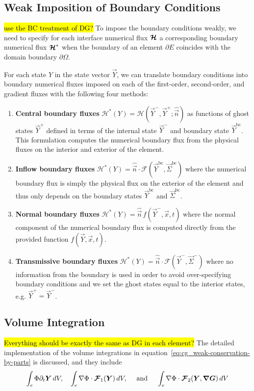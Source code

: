 \documentclass{report}
\numberwithin{equation}{section}
\begin{document}
\subsection{Weak Imposition of Boundary Conditions}
\hl{use the BC treatment of DG?}
To impose the boundary conditions weakly, we need to specify for each interface numerical flux $\boldsymbol{{\mathcal{H}}}$ a corresponding boundary numerical flux $\boldsymbol{{\mathcal{H}}}^*$ when the boundary of an element $\partial E$ coincides with the domain boundary $\partial \Omega$. 

For each state $Y$ in the state vector $\vec Y$, we can translate boundary conditions into boundary numerical fluxes imposed on each of the first-order, second-order, and gradient fluxes with the following four methods:
\begin{enumerate}
    \item \textbf{Central boundary fluxes} $\mathcal{H}^*(Y) = \mathcal{H}(\vec Y^-, \vec Y^+; \hat{\vec n })$ as functions of ghost states $\vec Y^+$ defined in terms of the internal state $\vec Y^-$ and boundary state $\vec Y^{\text{bc}}$. This formulation computes the numerical boundary flux from the physical fluxes on the interior and exterior of the element.
    \item \textbf{Inflow boundary fluxes} $\mathcal{H}^*(Y) = \hat{\vec n } \cdot \mathcal{F}(\vec Y^{\text{bc}}, \vec \Sigma^{\text{bc}})$ where the numerical boundary flux is simply the physical flux on the exterior of the element and thus only depends on the boundary states $\vec Y^{\text{bc}}$ and $\vec \Sigma^{\text{bc}}$.
    \item \textbf{Normal boundary fluxes} $\mathcal{H}^*(Y) = \hat{\vec n } \, f(\vec Y^-, \vec x, t)$ where the normal component of the numerical boundary flux is computed directly from the provided function $f(\vec Y, \vec x, t)$. 
    \item \textbf{Transmissive boundary fluxes} $\mathcal{H}^*(Y) = \hat{\vec n } \cdot \mathcal{F}(\vec Y^-, \vec \Sigma^-)$ where no information from the boundary is used in order to avoid over-specifying boundary conditions and we set the ghost states equal to the interior states, e.g. $\vec Y^+ = \vec Y^-$.
\end{enumerate}

\subsection{Volume Integration}
\hl{Everything should be exactly the same as DG in each element?}
The detailed implementation of the volume integrations in equation~\eqref{eq:cg_weak-conservation-by-parts} is discussed, and they include
\begin{align}
\int_e \Phi \partial_t \boldsymbol{{Y}} \, dV, \quad 
   \int_e \nabla \Phi \cdot \boldsymbol{{\mathcal{F}}}_1(\boldsymbol{{Y}}) \, dV, \quad  \textrm{ and } \quad
\int_e \nabla \Phi \cdot \boldsymbol{{\mathcal{F}}}_2(\boldsymbol{{Y}}, \boldsymbol{{\nabla}} \boldsymbol{{G}}) \, dV
\end{align}
\end{document}

